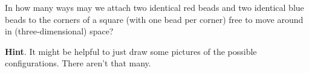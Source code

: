 \documentclass{book}
\begin{document}
\setcounter{cpjt}{113}
\addtocounter{cpjt}{-1}
\begin{activity}\label{twocolorsofbeads}
\hypertarget{p-779}{}%
In how many ways may we attach two identical red beads and two identical blue beads to the corners of a square (with one bead per corner) free to move around in (three-dimensional) space?%
\par\smallskip%
\noindent\textbf{Hint}.\hypertarget{hint-69}{}\quad%
\hypertarget{p-780}{}%
It might be helpful to just draw some pictures of the possible configurations. There aren't that many.%
\par\smallskip%
\noindent\end{activity}

\clearpage
\end{document}
